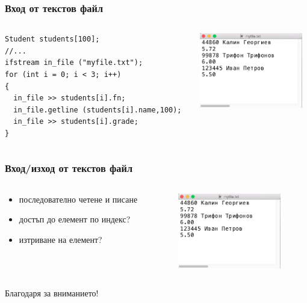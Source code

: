 \documentclass{beamer}
\begin{document}
\begin{frame}[fragile]
\frametitle{Вход от текстов файл}



\begin{columns}[t]
  \begin{column}{0.6\textwidth}
      \begin{flushleft}
      \begin{lstlisting}
Student students[100];
//...
ifstream in_file ("myfile.txt");
for (int i = 0; i < 3; i++)
{
  in_file >> students[i].fn;
  in_file.getline (students[i].name,100);
  in_file >> students[i].grade;
}
      \end{lstlisting}
      \end{flushleft} 
  \end{column}
  \begin{column}{0.4\textwidth}

  \includegraphics[width=4.5cm]{images/textedit}
  \end{column}
\end{columns}
\end{frame}




\begin{frame}[fragile]
\frametitle{Вход/изход от текстов файл}



\begin{columns}[t]
  \begin{column}{0.6\textwidth}
      \begin{flushleft}
      \begin{itemize}
        \item последователно четене и писане
        \item достъп до елемент по индекс?
        \item изтриване на елемент?
      \end{itemize}
      \end{flushleft} 
  \end{column}
  \begin{column}{0.4\textwidth}

  \includegraphics[width=4.5cm]{images/textedit}
  \end{column}
\end{columns}
\end{frame}


\begin{frame}
\centerline{Благодаря за вниманието!}
\end{frame}
\end{document}
